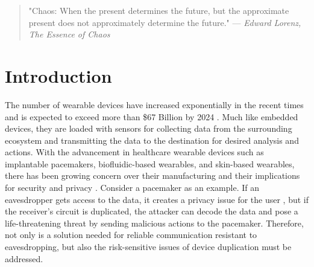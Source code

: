\begingroup
\RaggedRight

\begin{quote}
"Chaos: When the present determines the future, but the approximate present does not approximately determine the future."
\newline
\hfill  — \textit{Edward Lorenz, The Essence of Chaos}
\end{quote}

\section*{Introduction}\label{sec1}
The number of wearable devices have increased exponentially in the recent times and is expected to exceed more than \$67 Billion by 2024 \cite{9214833}. Much like embedded devices, they are loaded with sensors for collecting data from the surrounding ecosystem and transmitting the data to the destination for desired analysis and actions. With the advancement in healthcare wearable devices \cite{wang2022cloud} such as implantable pacemakers, biofluidic-based wearables, and skin-based wearables, there has been growing concern over their manufacturing and their implications for security and privacy \cite{wen2021quantum}. Consider a pacemaker as an example. If an eavesdropper gets access to the data, it creates a privacy issue for the user \cite{al2022medical}, but if the receiver's circuit is duplicated, the attacker can decode the data and pose a life-threatening threat by sending malicious actions to the pacemaker. Therefore, not only is a solution needed for reliable communication resistant to eavesdropping, but also the risk-sensitive issues of device duplication must be addressed.  

